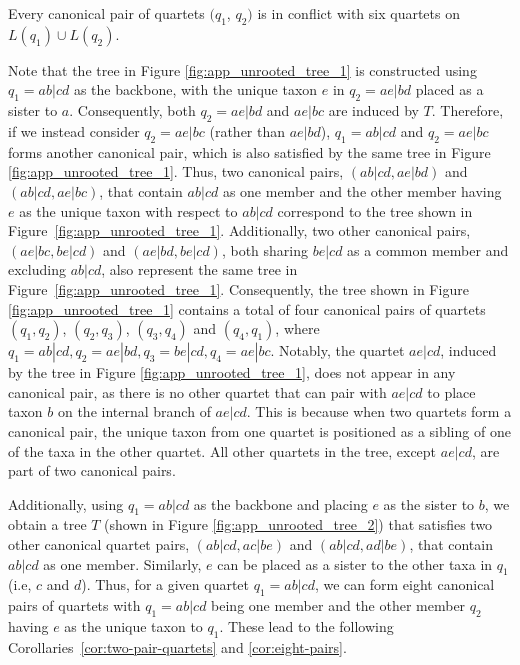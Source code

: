 \documentclass[runningheads]{llncs}
\begin{document}
\begin{appendices}
\begin{corollary}
\label{cor:six_conflict}
Every canonical pair of quartets $(q_1$, $q_2)$ is in conflict with six quartets on $L(q_1) \cup L(q_2)$.
\end{corollary}



Note that the tree in Figure \ref{fig:app_unrooted_tree_1} is constructed using $q_1 = ab|cd$ as the backbone, with the unique taxon $e$ in $q_2 = ae|bd$ placed as a sister to $a$. Consequently, both $q_2 = ae|bd$ and $ae|bc$ are induced by $T$. Therefore, if we instead consider $q_2 = ae|bc$ (rather than $ae|bd$), $q_1 = ab|cd$ and $q_2 = ae|bc$ forms another canonical pair, which is also satisfied by the same tree in Figure \ref{fig:app_unrooted_tree_1}.
Thus, two canonical pairs, $(ab|cd, ae|bd)$ and $(ab|cd, ae|bc)$, that contain $ab|cd$ as one member and the other member having $e$ as the unique taxon with respect to $ab|cd$ correspond to the tree shown in Figure~\ref{fig:app_unrooted_tree_1}. Additionally, two other canonical pairs, $(ae|bc, be|cd)$ and $(ae|bd, be|cd)$, both sharing $be|cd$ as a common member and excluding $ab|cd$, also represent the same tree in Figure~\ref{fig:app_unrooted_tree_1}. Consequently, the tree shown in Figure \ref{fig:app_unrooted_tree_1} contains a total of four canonical pairs of quartets $(q_1,q_2)$, $(q_2,q_3)$, $(q_3,q_4)$ and $(q_4,q_1)$, where $q_1 = ab|cd, q_2 = ae|bd, q_3= be|cd, q_4 = ae|bc$. Notably, the quartet $ae|cd$, induced by the tree in Figure \ref{fig:app_unrooted_tree_1}, does not appear in any canonical pair, as there is no other quartet that can pair with $ae|cd$ to place taxon $b$ on the internal branch of $ae|cd$. This is because when two quartets form a canonical pair, the unique taxon from one quartet is positioned as a sibling of one of the taxa in the other quartet. All other quartets in the tree, except $ae|cd$, are part of two canonical pairs.


Additionally, using $q_1 =ab|cd$ as the backbone and placing $e$ as the sister to $b$, we obtain a tree $T$ (shown in Figure \ref{fig:app_unrooted_tree_2}) that satisfies two other canonical quartet pairs, $(ab|cd, ac|be)$ and $(ab|cd, ad|be)$, that contain $ab|cd$ as one member. Similarly, $e$ can be placed as a sister to the other taxa in $q_1$ (i.e, $c$ and $d$). Thus, for a given quartet $q_1 = ab|cd$, we can form eight canonical pairs of quartets with $q_1 = ab|cd$ being one member and the other member $q_2$ having $e$ as the unique taxon to $q_1$. These lead to the following Corollaries~\ref{cor:two-pair-quartets} and \ref{cor:eight-pairs}. %



\end{appendices}
\end{document}
